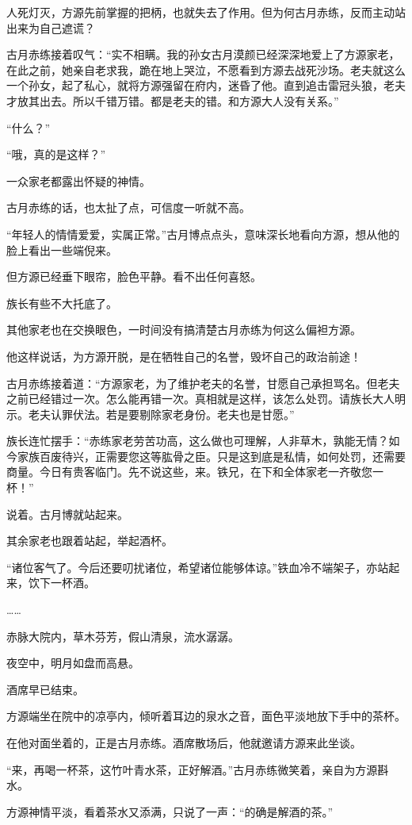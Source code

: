 \begin{this_body}
人死灯灭，方源先前掌握的把柄，也就失去了作用。但为何古月赤练，反而主动站出来为自己遮谎？

古月赤练接着叹气：“实不相瞒。我的孙女古月漠颜已经深深地爱上了方源家老，在此之前，她亲自老求我，跪在地上哭泣，不愿看到方源去战死沙场。老夫就这么一个孙女，起了私心，就将方源强留在府内，迷昏了他。直到追击雷冠头狼，老夫才放其出去。所以千错万错。都是老夫的错。和方源大人没有关系。”

“什么？”

“哦，真的是这样？”

一众家老都露出怀疑的神情。

古月赤练的话，也太扯了点，可信度一听就不高。

“年轻人的情情爱爱，实属正常。”古月博点点头，意味深长地看向方源，想从他的脸上看出一些端倪来。

但方源已经垂下眼帘，脸色平静。看不出任何喜怒。

族长有些不大托底了。

其他家老也在交换眼色，一时间没有搞清楚古月赤练为何这么偏袒方源。

他这样说话，为方源开脱，是在牺牲自己的名誉，毁坏自己的政治前途！

古月赤练接着道：“方源家老，为了维护老夫的名誉，甘愿自己承担骂名。但老夫之前已经错过一次。怎么能再错一次。真相就是这样，该怎么处罚。请族长大人明示。老夫认罪伏法。若是要剔除家老身份。老夫也是甘愿。”

族长连忙摆手：“赤练家老劳苦功高，这么做也可理解，人非草木，孰能无情？如今家族百废待兴，正需要您这等肱骨之臣。只是这到底是私情，如何处罚，还需要商量。今日有贵客临门。先不说这些，来。铁兄，在下和全体家老一齐敬您一杯！”

说着。古月博就站起来。

其余家老也跟着站起，举起酒杯。

“诸位客气了。今后还要叨扰诸位，希望诸位能够体谅。”铁血冷不端架子，亦站起来，饮下一杯酒。

……

赤脉大院内，草木芬芳，假山清泉，流水潺潺。

夜空中，明月如盘而高悬。

酒席早已结束。

方源端坐在院中的凉亭内，倾听着耳边的泉水之音，面色平淡地放下手中的茶杯。

在他对面坐着的，正是古月赤练。酒席散场后，他就邀请方源来此坐谈。

“来，再喝一杯茶，这竹叶青水茶，正好解酒。”古月赤练微笑着，亲自为方源斟水。

方源神情平淡，看着茶水又添满，只说了一声：“的确是解酒的茶。”


\end{this_body}

